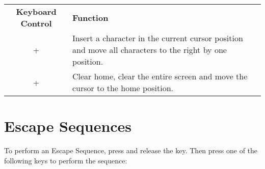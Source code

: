 \begin{center}
\begin{longtable}{c|L{5.5cm}}
	\textbf{Keyboard Control} & \textbf{Function}\\
  \hhline{==}
	\endhead

 +  &
Insert a character in the current cursor position and move all characters to the right by one position.\\
\hline
{} +  &
Clear home, clear the entire screen and move the cursor to the home position.\\
\hline

\end{longtable}
\end{center}


\newpage



\section{Escape Sequences}
\label{appendix:escapesequences}

To perform an Escape Sequence, press and release the  key. Then press one of the following keys to perform the sequence:

